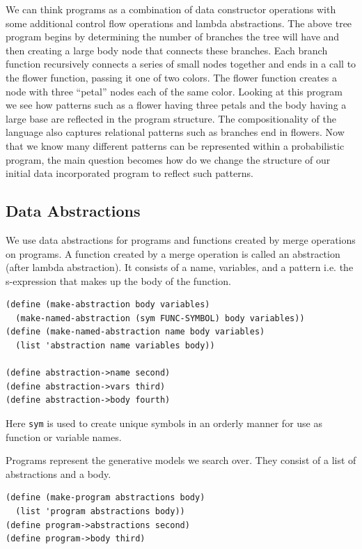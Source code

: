 \documentclass[a4paper,10pt]{article}
\begin{document}
We can think programs as a combination of data constructor operations with some additional control flow operations and lambda abstractions.  The above tree program begins by determining the number of branches the tree will have and then creating a large body node that connects these branches.  Each branch function recursively connects a series of small nodes together and ends in a call to the flower function, passing it one of two colors.  The flower function creates a node with three ``petal'' nodes each of the same color.  Looking at this program we see how patterns such as a flower having three petals and the body having a large base are reflected in the program structure.  The compositionality of the language also captures relational patterns such as branches end in flowers.  Now that we know many different patterns can be represented within a probabilistic program, the main question becomes how do we change the structure of our initial data incorporated program to reflect such patterns.

\subsection{Data Abstractions}
We use data abstractions for programs and functions created by merge operations on programs.  A function created by a merge operation is called an abstraction (after lambda abstraction).  It consists of a name, variables, and a pattern i.e. the s-expression that makes up the body of the function.  
\begin{lstlisting}[frame=trBL]
(define (make-abstraction body variables)
  (make-named-abstraction (sym FUNC-SYMBOL) body variables))
(define (make-named-abstraction name body variables)
  (list 'abstraction name variables body))

(define abstraction->name second)
(define abstraction->vars third)
(define abstraction->body fourth)
\end{lstlisting}
Here \texttt{sym} is used to create unique symbols in an orderly manner for use as function or variable names.


Programs represent the generative models we search over.  They consist of a list of abstractions and a body.
\begin{lstlisting}[frame=trBL]
(define (make-program abstractions body)
  (list 'program abstractions body))
(define program->abstractions second)
(define program->body third)
\end{lstlisting}  
\end{document}
